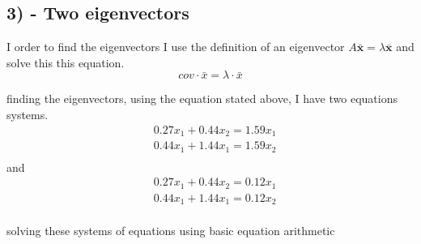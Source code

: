 \subsection{3) - Two eigenvectors}
I order to find the eigenvectors I use the definition of an eigenvector $A\bar{\textbf{x}} = \lambda\bar{\textbf{x}}$
and solve this this equation.
$$cov \cdot \bar{x} = \lambda \cdot \bar{x}$$

finding the eigenvectors, using the equation stated above, I have two equations systems.
\begin{align*}
    & 0.27 x_1 + 0.44 x_2 = 1.59 x_1 \\
    & 0.44 x_1 + 1.44 x_1 = 1.59 x_2 \\
\end{align*}
and 
\begin{align*}
    & 0.27 x_1 + 0.44 x_2 = 0.12 x_1 \\
    & 0.44 x_1 + 1.44 x_1 = 0.12 x_2 \\
\end{align*}

solving these systems of equations using basic equation arithmetic

